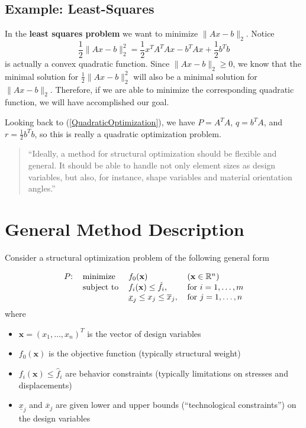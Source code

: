 \documentclass[11pt]{article}
\begin{document}
\subsection*{Example: Least-Squares}

In the {\color{tiananmen}\textbf{least squares problem}} we want to minimize {\color{baystate}$\|Ax-b\|_2$}. Notice {\color{baystate}$$\frac{1}{2}\|Ax-b\|_2^2=\frac{1}{2}x^TA^TAx-b^TAx+\frac{1}{2}b^Tb$$} is actually a convex quadratic function. Since $\|Ax-b\|_2\geq 0$, we know that the minimal solution for $\frac{1}{2}\|Ax-b\|_2^2$ will also be a minimal solution for $\|Ax-b\|_2$. Therefore, if we are able to minimize the corresponding quadratic function, we will have accomplished our goal.

Looking back to (\ref{QuadraticOptimization}), we have $P=A^TA$, $q=b^TA$, and $r=\frac{1}{2}b^Tb$, so this is really a quadratic optimization problem.
\\

{\huge {}}

\begin{quote}
	``Ideally, a method for structural optimization should be flexible and general. It should be able to handle not only element sizes as design variables, but also, for instance, shape variables and material orientation angles.''\cite{Svanberg1987}
\end{quote}

\section*{General Method Description}
Consider a structural optimization problem of the following general form

{\color{baystate}
	\begin{equation}
		\begin{tabular}{llll}
			$P$: & minimize & $f_0(\mathbf{x})$ & $\left(\mathbf{x}\in\mathbb{R}^n\right)$ \\
			& subject to & $f_i(\mathbf{x})\leq\hat{f}_i$, & for $i=1,\ldots,m$ \\
			&  & $\underline{x}_j\leq x_j\leq \overline{x}_j$, & for $j=1,\ldots,n$
		\end{tabular}
	\end{equation}
}
where
\begin{itemize}
	\item $\mathbf{x}=\left(x_1,\ldots,x_n\right)^T$ is the vector of {\color{tiananmen}design variables}
	\item $f_0(\mathbf{x})$ is the {\color{tiananmen}objective function} (typically structural weight)
	\item $f_i(\mathbf{x})\leq\hat{f}_i$ are {\color{tiananmen}behavior constraints} (typically limitations on stresses and displacements)
	\item $\underline{x}_j$ and $\overline{x}_j$ are given {\color{tiananmen}lower and upper bounds} (``technological constraints'') {\color{tiananmen}on the design variables}
\end{itemize}
\end{document}
